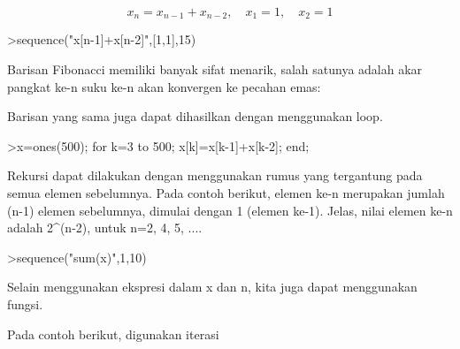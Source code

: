 \documentclass[a4paper,10pt]{article}
\begin{document}
\begin{eulernotebook}
\begin{eulercomment}
\begin{eulercomment}
\begin{eulercomment}
\begin{eulercomment}
\begin{eulercomment}
\end{eulercomment}
\begin{eulerformula}
\[
x_n = x_{n-1}+x_{n-2}, \quad x_1=1, \quad x_2 =1
\]
\end{eulerformula}
\begin{eulerprompt}
>sequence("x[n-1]+x[n-2]",[1,1],15)
\end{eulerprompt}
\begin{euleroutput}
  [1,  1,  2,  3,  5,  8,  13,  21,  34,  55,  89,  144,  233,  377,  610]
\end{euleroutput}
\begin{eulercomment}
Barisan Fibonacci memiliki banyak sifat menarik, salah satunya adalah akar pangkat ke-n suku
ke-n akan konvergen ke pecahan emas:
\end{eulercomment}
\begin{eulercomment}
Barisan yang sama juga dapat dihasilkan dengan menggunakan loop.
\end{eulercomment}
\begin{eulerprompt}
>x=ones(500); for k=3 to 500; x[k]=x[k-1]+x[k-2]; end;
\end{eulerprompt}
\begin{eulercomment}
Rekursi dapat dilakukan dengan menggunakan rumus yang tergantung pada semua elemen
sebelumnya. Pada contoh berikut, elemen ke-n merupakan jumlah (n-1) elemen sebelumnya,
dimulai dengan 1 (elemen ke-1). Jelas, nilai elemen ke-n adalah 2\textasciicircum{}(n-2), untuk n=2, 4, 5,
....
\end{eulercomment}
\begin{eulerprompt}
>sequence("sum(x)",1,10)
\end{eulerprompt}
\begin{euleroutput}
  [1,  1,  2,  4,  8,  16,  32,  64,  128,  256]
\end{euleroutput}
\begin{eulercomment}
Selain menggunakan ekspresi dalam x dan n, kita juga dapat menggunakan fungsi.

Pada contoh berikut, digunakan iterasi


\end{eulercomment}
\end{eulercomment}
\end{eulercomment}
\end{eulercomment}
\end{eulercomment}
\end{eulernotebook}
\end{document}
